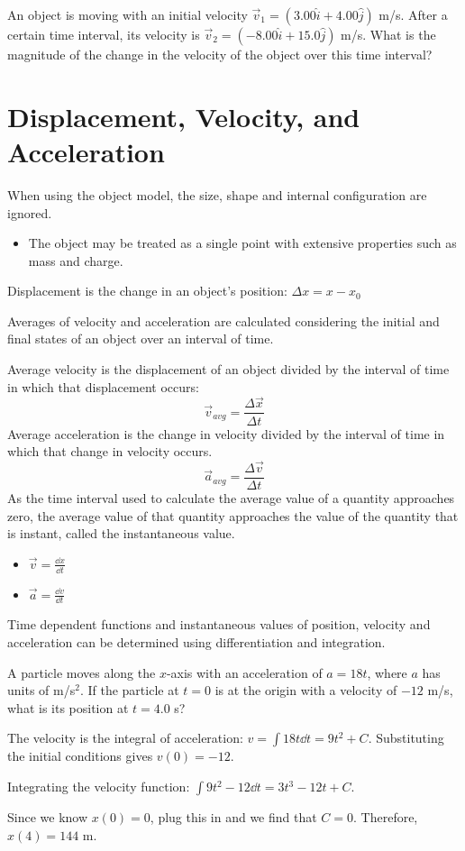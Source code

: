 \documentclass[../mech.tex]{subfiles}
\begin{document}
\ex An object is moving with an initial velocity $\vec{v}_1=(3.00\hat{i}+4.00\hat{j})$ m/s. After a certain time interval, its velocity is $\vec{v}_2=(-8.00\hat{i}+15.0\hat{j})$ m/s. What is the magnitude of the change in the velocity of the object over this time interval?

\section{Displacement, Velocity, and Acceleration}
When using the object model, the size, shape and internal configuration are ignored.
\begin{itemize}
    \item The object may be treated as a single point with extensive properties such as mass and charge.
\end{itemize}
Displacement is the change in an object's position: $\Delta x = x-x_0$

Averages of velocity and acceleration are calculated considering the initial and final states of an object over an interval of time.

Average velocity is the displacement of an object divided by the interval of time in which that displacement occurs:
\[ \vec{v}_{avg}=\frac{\Delta \vec{x}}{\Delta t}\]
Average acceleration is the change in velocity divided by the interval of time in which that change in velocity occurs.
\[ \vec{a}_{avg}=\frac{\Delta \vec{v}}{\Delta t}\]
As the time interval used to calculate the average value of a quantity approaches zero, the average value of that quantity approaches the value of the quantity that is instant, called the instantaneous value.
\begin{itemize}
    \item $\vec{v} = \frac{\dd x}{\dd t}$
    \item $\vec{a} = \frac{\dd v}{\dd t}$
\end{itemize}

Time dependent functions and instantaneous values of position, velocity and acceleration can be determined using differentiation and integration.

\begin{example}
    A particle moves along the $x$-axis with an acceleration of $a=18t$, where $a$ has units of m/s$^2$. If the particle at $t=0$ is at the origin with a velocity of $-12$ m/s, what is its position at $t=4.0$ s?

    The velocity is the integral of acceleration: $v=\int 18t \dd t = 9t^2+C$. Substituting the initial conditions gives $v(0)=-12$.

    Integrating the velocity function: $\int 9t^2-12\dd t = 3t^3-12t+C$.

    Since we know $x(0)=0$, plug this in and we find that $C=0$. Therefore, $x(4)=144$ m.
\end{example}
\end{document}
